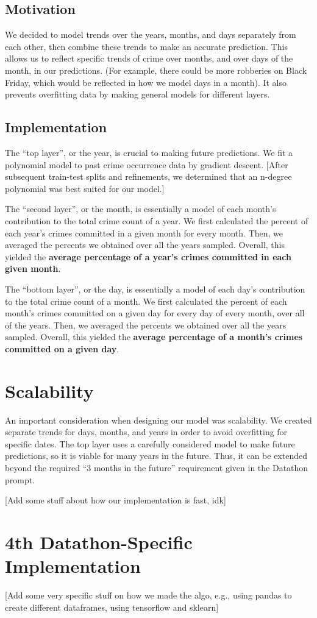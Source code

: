 \documentclass{article}
\begin{document}
\subsection{Motivation}

We decided to model trends over the years, months, and days separately from each other, then combine these trends to make an accurate prediction. This allows us to reflect specific trends of crime over months, and over days of the month, in our predictions. (For example, there could be more robberies on Black Friday, which would be reflected in how we model days in a month). It also prevents overfitting data by making general models for different layers.

\subsection{Implementation}

The ``top layer'', or the year, is crucial to making future predictions. We fit a polynomial model to past crime occurrence data by gradient descent. [After subsequent train-test splits and refinements, we determined that an n-degree polynomial was best suited for our model.] \bigskip 

The ``second layer'', or the month, is essentially a model of each month's contribution to the total crime count of a year. We first calculated the percent of each year's crimes committed in a given month for every month. Then, we averaged the percents we obtained over all the years sampled. Overall, this yielded the \textbf{average percentage of a year's crimes committed in each given month}. \bigskip 

The ``bottom layer'', or the day, is essentially a model of each day's contribution to the total crime count of a month. We first calculated the percent of each month's crimes committed on a given day for every day of every month, over all of the years. Then, we averaged the percents we obtained over all the years sampled. Overall, this yielded the \textbf{average percentage of a month's crimes committed on a given day}. \bigskip 

\section{Scalability}

An important consideration when designing our model was scalability. We created separate trends for days, months, and years in order to avoid overfitting for specific dates. The top layer uses a carefully considered model to make future predictions, so it is viable for many years in the future. Thus, it can be extended beyond the required ``3 months in the future'' requirement given in the Datathon prompt. \bigskip

[Add some stuff about how our implementation is fast, idk]

\section{4th Datathon-Specific Implementation}

[Add some very specific stuff on how we made the algo, e.g., using pandas to create different dataframes, using tensorflow and sklearn]
\end{document}
